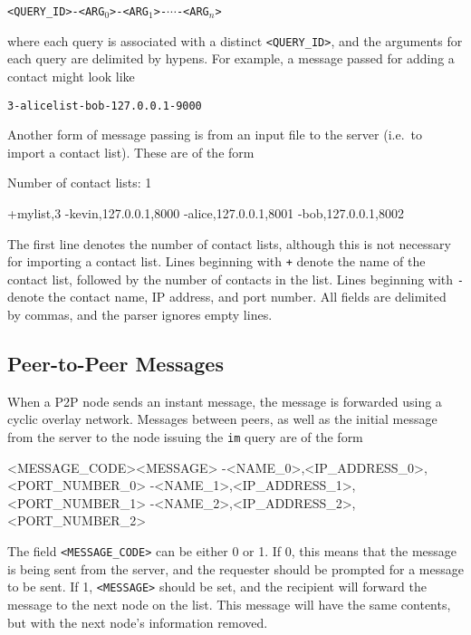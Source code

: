 \documentclass[letterpaper]{article}
\newenvironment{CVerbatim}
 {\singlespacing\center\BVerbatim}
 {\endBVerbatim\endcenter}
\begin{document}
\begin{center}
{\tt <QUERY\_ID>-<ARG$_0$>-<ARG$_1$>-$\cdots$-<ARG$_n$>}
\end{center}

\noindent where each query is associated with a distinct {\tt <QUERY\_ID>}, and the arguments for each query are delimited by hypens. For example, a message passed for adding a contact might look like

\begin{center}
    {\tt3-alicelist-bob-127.0.0.1-9000}
\end{center}

Another form of message passing is from an input file to the server (i.e.\ to import a contact list). These are of the form

\begin{CVerbatim}[fontsize=\small]
Number of contact lists: 1

+mylist,3
-kevin,127.0.0.1,8000
-alice,127.0.0.1,8001
-bob,127.0.0.1,8002
\end{CVerbatim}

\noindent The first line denotes the number of contact lists, although this is not necessary for importing a contact list. Lines beginning with {\tt +} denote the name of the contact list, followed by the number of contacts in the list. Lines beginning with {\tt -} denote the contact name, IP address, and port number. All fields are delimited by commas, and the parser ignores empty lines.

\subsection{Peer-to-Peer Messages}

When a P2P node sends an instant message, the message is forwarded using a cyclic overlay network. Messages between peers, as well as the initial message from the server to the node issuing the {\tt im} query are of the form

\begin{CVerbatim}[fontsize=\small]
<MESSAGE_CODE><MESSAGE>
-<NAME_0>,<IP_ADDRESS_0>,<PORT_NUMBER_0>
-<NAME_1>,<IP_ADDRESS_1>,<PORT_NUMBER_1>
-<NAME_2>,<IP_ADDRESS_2>,<PORT_NUMBER_2>
\end{CVerbatim}

The field {\tt<MESSAGE\_CODE>} can be either 0 or 1. If 0, this means that the message is being sent from the server, and the requester should be prompted for a message to be sent. If 1, {\tt <MESSAGE>} should be set, and the recipient will forward the message to the next node on the list. This message will have the same contents, but with the next node's information removed. 
\end{document}
